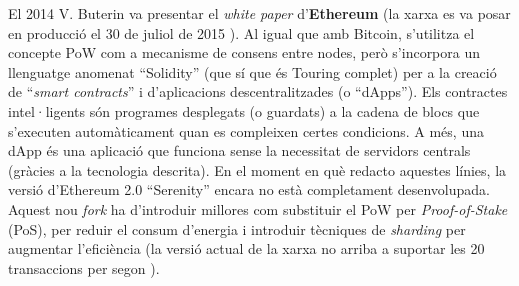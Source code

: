 \documentclass[11pt,a4paper]{article}
\begin{document}
El 2014 V. Buterin va presentar el \textit{white paper} d'\textbf{Ethereum} \cite{vuterin2014} (la xarxa es va posar en producció el 30 de juliol de 2015 \cite{tual2015}). Al igual que amb Bitcoin, s'utilitza el concepte PoW com a mecanisme de consens entre nodes, però s'incorpora un llenguatge anomenat ``Solidity'' (que sí que és Touring complet) per a la creació de ``\textit{smart contracts}'' i d'aplicacions descentralitzades (o ``dApps''). Els contractes intel·ligents són programes desplegats (o guardats) a la cadena de blocs que s'executen automàticament quan es compleixen certes condicions. A més, una dApp és una aplicació que funciona sense la necessitat de servidors centrals (gràcies a la tecnologia descrita). En el moment en què redacto aquestes línies, la versió d'Ethereum 2.0 ``Serenity'' encara no està completament desenvolupada. Aquest nou \textit{fork} ha d'introduir millores com substituir el PoW per \textit{Proof-of-Stake} (PoS), per reduir el consum d'energia i introduir tècniques de \textit{sharding} per augmentar l'eficiència (la versió actual de la xarxa no arriba a suportar les 20 transaccions per segon \cite{mech2018}).
\end{document}
